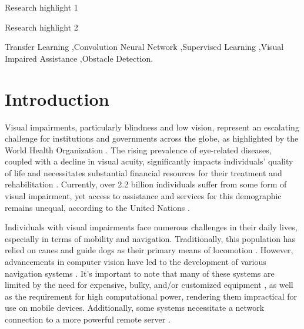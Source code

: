 \documentclass[preprint,12pt,authoryear]{elsarticle}
\begin{document}
\begin{frontmatter}

\begin{highlights}
\item Research highlight 1
\item Research highlight 2
\end{highlights}

\begin{keyword}
	Transfer Learning  \sep Convolution Neural Network \sep Supervised Learning \sep Visual Impaired Assistance \sep Obstacle Detection.


\end{keyword}

\end{frontmatter}


\section{Introduction}\label{sec:introdution}

Visual impairments, particularly blindness and low vision, represent an escalating challenge for institutions and governments across the globe, as highlighted by the World Health Organization \cite{who2022}. The rising prevalence of eye-related diseases, coupled with a decline in visual acuity, significantly impacts individuals' quality of life and necessitates substantial financial resources for their treatment and rehabilitation \cite{who2022}. Currently, over 2.2 billion individuals suffer from some form of visual impairment, yet access to assistance and services for this demographic remains unequal, according to the United Nations \cite{who2022,bourne2017,onu2019,bourne2020}.

Individuals with visual impairments face numerous challenges in their daily lives, especially in terms of mobility and navigation. Traditionally, this population has relied on canes and guide dogs as their primary means of locomotion \cite{islam2019}. However, advancements in computer vision have led to the development of various navigation systems \cite{islam2019,mandia2023,budrionis2022,kuriakose2021,cardillo2019,bai2019,jiang2019,joe2019,hoang2017,tapu2017,saffoury2016,poggi2016,lakde2015}. It's important to note that many of these systems are limited by the need for expensive, bulky, and/or customized equipment \cite{hoang2017,tapu2017,saffoury2016,poggi2016,poggi2015,rizzo2017}, as well as the requirement for high computational power, rendering them impractical for use on mobile devices. Additionally, some systems necessitate a network connection to a more powerful remote server \cite{jiang2019,lin2017}.
\end{document}
